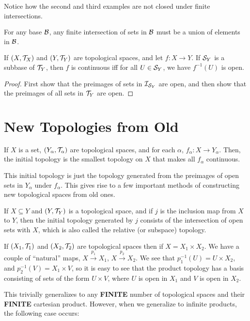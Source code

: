 Notice how the second and third examples are not closed under finite intersections. 

\begin{proposition}
    For any base $\mathcal B$, any finite intersection of sets in $\mathcal B$ must be a union of elements in $\mathcal B$.
\end{proposition}

\begin{proposition}
    \label{prop:subbasecontinuity}
    If $(X, \mathcal T_X)$ and $(Y, \mathcal T_Y)$ are topological spaces, and let $f \colon X \to Y$. If $\mathcal S_Y$ is a subbase of $\mathcal T_Y$, then $f$ is continuous iff for all $U \in \mathcal S_Y$, we have $f^{-1}(U)$ is open.
\end{proposition}

\begin{proof}
    First show that the preimages of sets in $\mathcal I_{\mathcal S_Y}$ are open, and then show that the preimages of all sets in $\mathcal T_Y$ are open.
\end{proof}

\section{New Topologies from Old}

\begin{definition}
    If $X$ is a set, $(Y_\alpha, \mathcal T_\alpha)$ are topological spaces, and for each $\alpha$, $f_\alpha\colon X \to Y_\alpha$. Then, the initial topology is the smallest topology on $X$ that makes all $f_\alpha$ continuous.
\end{definition}

This initial topology is just the topology generated from the preimages of open sets in $Y_\alpha$ under $f_\alpha$. This gives rise to a few important methods of constructing new topological spaces from old ones.

\begin{definition}
    If $X \subseteq Y$ and $(Y, \mathcal T_Y)$ is a topological space, and if $j$ is the inclusion map from $X$ to $Y$, then the initial topology generated by $j$ consists of the intersection of open sets with $X$, which is also called the relative (or subspace) topology. 
\end{definition}

\begin{definition}
    If $(X_1, \mathcal T_1)$ and $(X_2, \mathcal T_2)$ are topological spaces then if $X = X_1 \times X_2$. We have a couple of ``natural'' maps, $X \xrightarrow{p_1} X_1$, $X \xrightarrow{p_2} X_2$. We see that $p_1^{-1}(U) = U \times X_2$, and $p_2^{-1}(V) = X_1 \times V$, so it is easy to see that the product topology has a basis consisting of sets of the form $U \times V$, where $U$ is open in $X_1$ and $V$ is open in $X_2$.

    This trivially generalizes to any {\bfseries FINITE} number of topological spaces and their {\bfseries FINITE} cartesian product. However, when we generalize to infinite products, the following case occurs:
\end{definition}

